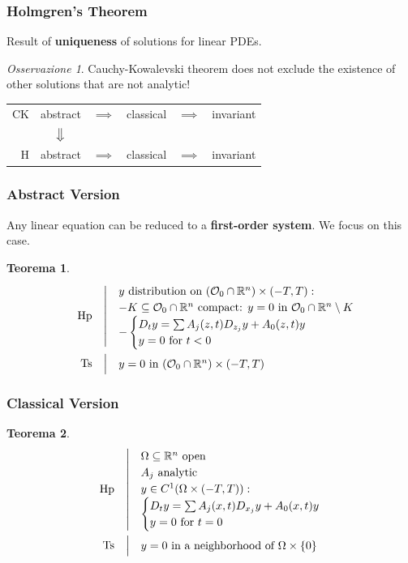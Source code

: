\documentclass[serif,notheorems]{beamer}
\makeatletter
\newenvironment{ipotesi}%
{\quad\left|\quad\def\arraystretch{1.2}\begin{array}{@{}l@{}}}%
{\end{array}\right.}
\newcommand{\hpth}[2]
{
\begin{align*}
\quad
\text{Hp}
&\begin{ipotesi}
#1
\end{ipotesi}\\
\text{Ts}
&\begin{ipotesi}
#2
\end{ipotesi}
\end{align*}
}
\theoremstyle{definition} %
\newtheorem{theorem}{Teorema}[section] %
\theoremstyle{remark}
\newtheorem*{remark}{Osservazione}
\makeatother
\begin{document}
\begin{frame}
\frametitle{Holmgren's Theorem}
Result of \textbf{uniqueness} of solutions for linear PDEs.
\begin{remark}
Cauchy-Kowalevski theorem does not exclude the existence of other solutions that are not analytic!
\end{remark}
\end{frame}

\begin{frame}
\begin{table}
\renewcommand{\arraystretch}{1.5}
\begin{tabular}{r||ccccc} 
CK & abstract & $\implies$  & classical & $\implies$ & invariant\\
&$\big\Downarrow$ &&&&\\
H & abstract & $\implies$ & classical & $\implies$ & invariant\\
\end{tabular}
\end{table}
\end{frame}

\begin{frame}
\frametitle{Abstract Version}
Any linear equation can be reduced to a \textbf{first-order system}. We focus on this case. 
\begin{theorem}
\hpth{
y \text{ distribution on } (\mathcal{O}_0 \cap \mathbb{R}^n) \times (-T,T):\\
- K\subseteq  \mathcal{O}_0 \cap \mathbb{R}^n \text{ compact: } y=0  \text{ in } \mathcal{O}_0 \cap \mathbb{R}^n \setminus K\\
- \begin{cases}
D_t y = \sum A_j (z,t) D_{z_j}y+A_0(z,t)y \\
y=0 \text{ for } t<0
\end{cases}\\
}{
y = 0 \text{ in } (\mathcal{O}_0 \cap \mathbb{R}^n) \times (-T,T) \\
}
\end{theorem}
\end{frame}

\begin{frame}
\frametitle{Classical Version}
\begin{theorem}
\hpth{
\Omega \subseteq \mathbb{R}^n \text{ open}\\
A_j \text{ analytic}\\
y\in C^1 (\Omega \times (-T,T)): \\ 
\begin{cases}
D_t y = \sum A_j (x,t) D_{x_j}y+A_0(x,t)y \\
y=0 \text{ for } t=0
\end{cases} \\
}{
y = 0 \text{ in a neighborhood of } \Omega \times \{ 0\}
}
\end{theorem}
\end{frame}
\end{document}
